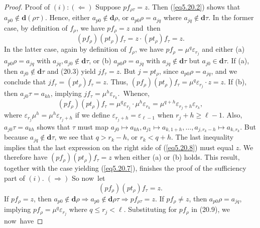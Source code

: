 \documentclass{surv-l}
\numberwithin{equation}{section}
\numberwithin{table}{section}
\numberwithin{figure}{section}
\theoremstyle{plain}
\theoremstyle{definition}
\begin{document}
\begin{proof} Proof of $(i): (\Leftarrow)$ Suppose $pf_{\rho\tau}=z$.
Then (\ref{eq5.20.2}) shows that $a_{p0}\not\in
\mathbf{d}(\rho\tau)$. Hence, either $a_{p0}\not\in
\mathbf{d}\rho$, or $a_{p0}\rho=a_{jq}$ where $ a_{jq}\not\in
\mathbf{d}\tau$. In the former case, by definition of $f_{\rho}$,
we have $pf_{\rho}=z$ and~then
\begin{equation}\label{eq5.20.7}
(pf_{\rho})(pt_{\rho})f_{\tau}=z\cdot(pt_{\rho})f_{\tau}=z.
\end{equation}
In the latter case, again by definition of $f_{\rho}$, we have
$pf_{\rho}=\mu^{q}\varepsilon_{r_{j}}$ and either (a)
$a_{p0}\rho=a_{jq}$ with $a_{jq},  a_{j0}\not\in \mathbf{d}\tau$,
or (b) $a_{p0}\rho=a_{jq}$ with $ a_{jq}\not\in \mathbf{d}\tau$
but $a_{j0}\in \textbf{d}\tau$. If (a), then $ a_{j0}\not\in \mathbf{d}\tau$
and (20.3) yield $jf_{\tau}=z$. But $j=pt_{\rho}$, since
$a_{p0}\rho=a_{jq}$, and we conclude that
$jf_{\tau}=(pt_{\rho})f_{\tau}=z$. Thus,
$(pf_{\rho})(pt_{\rho})f_{\tau}= \mu^{q}\varepsilon_{r_{j}}\cdot
z=z$. If (b), then $a_{j0}\tau=a_{kh}$, implying
$jf_{\tau}=\mu^{h}\varepsilon_{r_{k}}$.~Whence,
\begin{equation}\label{eq5.20.8}
 (pf_{\rho})(pt_{\rho})f_{\tau}=\mu^{q}\varepsilon_{r_{j}}\cdot\mu^{h}\varepsilon_{r_{k}}
 =\mu^{q+h}\varepsilon_{r_{j}+h}\varepsilon_{r_{k}},
\end{equation}
where $\varepsilon_{r_{j}}\mu^{h}=\mu^{h}\varepsilon_{r_{j}+h}$ if
we define $\varepsilon_{r_{j}+h}=\varepsilon_{\ell-1}$ when
$r_{j}+h\geq\ell-1$. Also, $a_{j0}\tau=a_{kh}$ shows that $\tau$
must map $a_{j0}\mapsto a_{kh}, a_{j1}\mapsto a_{k,1+h},\ldots,
a_{j,r_{k}-h}\mapsto a_{k,r_{k}}$. But because $ a_{jq}\not\in
\mathbf{d}\tau$, we see that $q>r_{k}-h$, or $r_{k}<q+h$. The last
inequality implies that the last expression on the right side of
(\ref{eq5.20.8}) must equal $z$. We therefore have
$(pf_{\rho})(pt_{\rho})f_{\tau}=z$ when either (a) or (b) holds.
This result, together with the case yielding (\ref{eq5.20.7}),
finishes the proof of the sufficiency part of $(i)$. $(\Rightarrow)$
So now~let
\begin{equation}\label{eq5.20.9}
 (pf_{\rho})(pt_{\rho})f_{\tau}=z.
\end{equation}
If $pf_{\rho}=z$, then $a_{p0}\not\in \mathbf{d}\rho\Rightarrow
a_{p0}\not\in \mathbf{d}\rho\tau\Rightarrow pf_{\rho\tau}=z$. If
$pf_{\rho}\neq z$, then $a_{p0}\rho=a_{jq}$, implying
$pf_{\rho}=\mu^{q}\varepsilon_{r_{j}}$ where $ q\leq r_{j}<\ell$.
Substituting for $pf_{\rho}$ in (20.9), we now~have

\end{proof}
\end{document}
